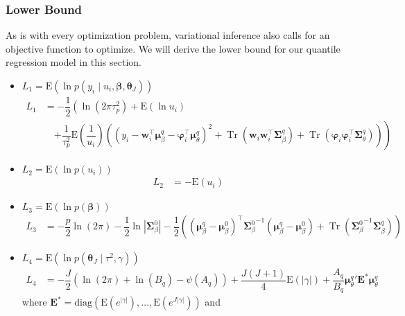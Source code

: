 \documentclass[12pt]{article}
\newcommand{\bs}{\boldsymbol}
\DeclareMathOperator{\Tr}{Tr}
\begin{document}
\subsubsection{Lower Bound}
  As is with every optimization problem, variational inference also calls for an objective function to optimize. We will derive the lower bound for our quantile regression model in this section.
  \begin{itemize}
    \item $L_{1}=\mathrm{E}\left(\ln p\left(y_{i}\;|\;u_{i}, \bs{\beta},\bs{\theta}_{J}\right)\right)$
    \begin{align}
      L_{1} &= -\dfrac{1}{2}\left(\ln\left(2\pi\tau_{p}^{2}\right)+\mathrm{E}\left(\ln u_{i}\right)\right.\\
      &\quad \left.+\dfrac{1}{\tau_{p}^{2}}\mathrm{E}\left(\dfrac{1}{u_{i}}\right)\left(\left(y_{i}-\bs{w}_{i}^{\top}\bs{\mu}_{\beta}^{q}-\bs{\varphi}_{i}^{\top}\bs{\mu}_{\theta}^{q}\right)^{2}+\Tr\left(\bs{w}_{i}\bs{w}_{i}^{\top}\bs{\Sigma}_{\beta}^{q}\right)+\Tr\left(\bs{\varphi}_{i}\bs{\varphi}_{i}^{\top}\bs{\Sigma}_{\theta}^{q}\right) \right)\right)
    \end{align}
    \item $L_{2}=\mathrm{E}\left(\ln p\left(u_{i}\right)\right)$
    \begin{align}
      L_{2} &= -\mathrm{E}\left(u_{i}\right)
    \end{align}
    \item $L_{3}=\mathrm{E}\left(\ln p\left(\bs{\beta}\right)\right)$
    \begin{align}
      L_{3} &= -\dfrac{p}{2}\ln\left(2\pi\right)-\dfrac{1}{2}\ln\left|\bs{\Sigma}_{\beta}^{0}\right| -\dfrac{1}{2}\left(\left(\bs{\mu}_{\beta}^{q}-\bs{\mu}_{\beta}^{0}\right)^{\top}{\bs{\Sigma}_{\beta}^{0}}^{-1}\left(\bs{\mu}_{\beta}^{q}-\bs{\mu}_{\beta}^{0}\right)+\Tr\left({\bs{\Sigma}_{\beta}^{0}}^{-1}\bs{\Sigma}_{\beta}^{q}\right) \right)
    \end{align}
    \item $L_{4}=\mathrm{E}\left(\ln p\left(\bs{\theta}_{J}\;|\;\tau^{2},\gamma\right)\right)$
    \begin{align}
      L_{4} &= -\dfrac{J}{2}\left(\ln\left(2\pi\right)+\ln\left(B_{q}\right)-\psi\left(A_{q}\right)\right)+\dfrac{J\left(J+1\right)}{4}\mathrm{E}\left(\left|\gamma\right|\right)+\dfrac{A_{q}}{B_{q}}{\bs{\mu}_{\theta}^{q}}'\mathbf{E}^{*}\bs{\mu}_{\theta}^{q}
    \end{align}
    where $\mathbf{E}^{*}=\mathrm{diag}\left(\mathrm{E}\left(e^{\left|\gamma\right|}\right),\ldots,\mathrm{E}\left(e^{J\left|\gamma\right|}\right)\right)$ and

\end{itemize}
\end{document}
